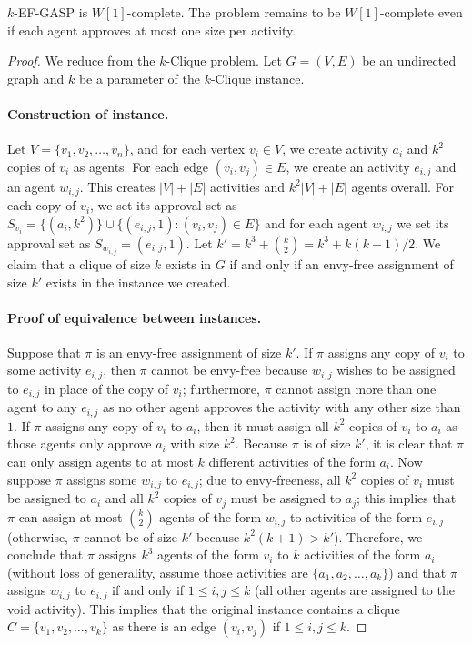 \begin{theorem} \label{GASP:thm:ef_gasp_w1}
$k$-EF-GASP is $W[1]$-complete. 
The problem remains to be $W[1]$-complete even if each agent approves at most one size per activity.
\end{theorem}
\begin{proof} %
	We reduce from the $k$-Clique problem. Let $G = (V, E)$ be an undirected graph and $k$ be a parameter of the $k$-Clique instance.

	\paragraph{Construction of \GASPs instance.}
	Let $V = \{v_1, v_2, \dots, v_n\}$, and for each vertex $v_i\in V$, we create activity $a_i$ and $k^2$ copies of $v_i$ as agents.
	For each edge $(v_i, v_j)\in E$, we create an activity $e_{i,j}$ and an agent $w_{i,j}$.
	This creates $|V| + |E|$ activities and $k^2|V| + |E|$ agents overall.
	For each copy of $v_i$, we set its approval set as $S_{v_i} = \{(a_i, k^2)\} \cup \{(e_{i,j}, 1) : (v_i, v_j)\in E\}$ and for each agent $w_{i,j}$ we set its approval set as $S_{w_{i,j}} = (e_{i,j}, 1)$.
	Let $k' = k^3 + \binom{k}{2} = k^3 + k(k-1)/2$.
	We claim that a clique of size $k$ exists in $G$ if and only if an envy-free assignment of size $k'$ exists in the \GASPs instance we created.
	
	\paragraph{Proof of equivalence between instances.}	
	Suppose that $\pi$ is an envy-free assignment of size $k'$. If $\pi$ assigns any copy of $v_i$ to some activity $e_{i,j}$, then $\pi$ cannot be envy-free because $w_{i,j}$ wishes to be assigned to $e_{i,j}$ in place of the copy of $v_i$; furthermore, $\pi$ cannot assign more than one agent to any $e_{i,j}$ as no other agent approves the activity with any other size than $1$. If $\pi$ assigns any copy of $v_i$ to $a_i$, then it must assign all $k^2$ copies of $v_i$ to $a_i$ as those agents only approve $a_i$ with size $k^2$. Because $\pi$ is of size $k'$, it is clear that $\pi$ can only assign agents to at most $k$ different activities of the form $a_i$. 
	Now suppose $\pi$ assigns some $w_{i,j}$ to $e_{i,j}$; due to envy-freeness, all $k^2$ copies of $v_i$ must be assigned to $a_i$ and all $k^2$ copies of $v_j$ must be assigned to $a_j$; this implies that $\pi$ can assign at most $\binom{k}{2}$ agents of the form $w_{i,j}$ to activities of the form $e_{i,j}$ (otherwise, $\pi$ cannot be of size $k'$ because $k^2(k+1) > k'$). Therefore, we conclude that $\pi$ assigns $k^3$ agents of the form $v_i$ to $k$ activities of the form $a_i$ (without loss of generality, assume those activities are $\{a_1, a_2, \dots, a_k\}$) and that $\pi$ assigns $w_{i,j}$ to $e_{i,j}$ if and only if $1 \leq i, j \leq k$ (all other agents are assigned to the void activity). This implies that the original instance contains a clique $C = \{v_1, v_2, \dots, v_k\}$ as there is an edge $(v_i,v_j)$ if $1 \leq i,j \leq k$. 
	

\end{proof}
